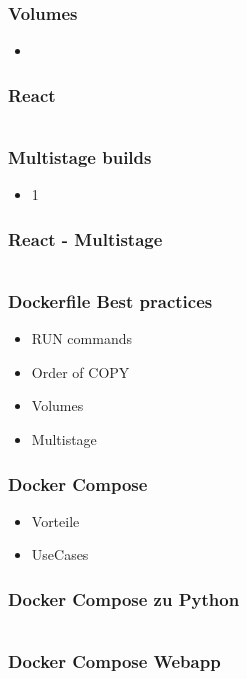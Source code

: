 \documentclass[22pt,handout]{beamer}
\begin{document}
\begin{frame}[t]
    \frametitle{Volumes}
    \begin{itemize}
        \item 
    \end{itemize} 
\end{frame}

\begin{frame}[fragile]
    \frametitle{React}
    \inputminted[fontsize=\footnotesize, frame=lines]{dockerfile}{../examples/Dockerfile.cmd}
\end{frame}

\begin{frame}[t]
    \frametitle{Multistage builds}
    \begin{itemize}
        \item 1
    \end{itemize} 
\end{frame}

\begin{frame}[fragile]
    \frametitle{React - Multistage}
    \inputminted[fontsize=\footnotesize, frame=lines]{dockerfile}{../examples/Dockerfile.cmd}
\end{frame}

\begin{frame}[t]
    \frametitle{Dockerfile Best practices}
    \begin{itemize}
        \item RUN commands
        \item Order of COPY
        \item Volumes
        \item Multistage
    \end{itemize} 
\end{frame}

\begin{frame}[t]
    \frametitle{Docker Compose}
    \begin{itemize}
        \item Vorteile
        \item UseCases
    \end{itemize} 
\end{frame}

\begin{frame}[fragile]
    \frametitle{Docker Compose zu Python}
    \inputminted[fontsize=\footnotesize, frame=lines]{dockerfile}{../examples/Dockerfile.cmd}
\end{frame}

\begin{frame}[fragile]
    \frametitle{Docker Compose Webapp}
    \inputminted[fontsize=\footnotesize, frame=lines]{dockerfile}{../examples/Dockerfile.cmd}
\end{frame}
\end{document}
